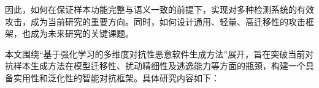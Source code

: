 因此，如何在保证样本功能完整与语义一致的前提下，实现对多种检测系统的有效攻击，成为当前研究的重要方向。同时，如何设计通用、轻量、高迁移性的攻击框架，也成为未来研究的关键课题。



本文围绕“基于强化学习的多维度对抗性恶意软件生成方法”展开，旨在突破当前对抗样本生成方法在模型迁移性、扰动精细性及逃逸能力等方面的瓶颈，构建一个具备实用性和泛化性的智能对抗框架。具体研究内容如下：

